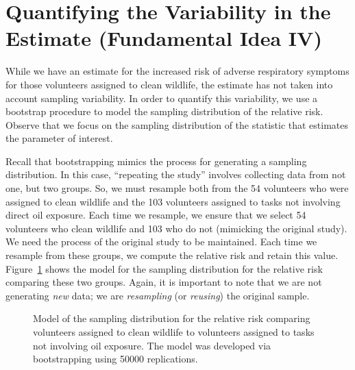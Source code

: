 \documentclass[
  letterpaper,
  DIV=11,
  numbers=noendperiod]{scrreprt}
\theoremstyle{definition}
\theoremstyle{definition}
\theoremstyle{plain}
\theoremstyle{remark}
\begin{document}
\section{Quantifying the Variability in the Estimate (Fundamental Idea
IV)}\label{quantifying-the-variability-in-the-estimate-fundamental-idea-iv}

While we have an estimate for the increased risk of adverse respiratory
symptoms for those volunteers assigned to clean wildlife, the estimate
has not taken into account sampling variability. In order to quantify
this variability, we use a bootstrap procedure to model the sampling
distribution of the relative risk. Observe that we focus on the sampling
distribution of the statistic that estimates the parameter of interest.

Recall that bootstrapping mimics the process for generating a sampling
distribution. In this case, ``repeating the study'' involves collecting
data from not one, but two groups. So, we must resample both from the 54
volunteers who were assigned to clean wildlife and the 103 volunteers
assigned to tasks not involving direct oil exposure. Each time we
resample, we ensure that we select 54 volunteers who clean wildlife and
103 who do not (mimicking the original study). We need the process of
the original study to be maintained. Each time we resample from these
groups, we compute the relative risk and retain this value.
Figure~\ref{fig-recaplanguage-sampling-distribution} shows the model for
the sampling distribution for the relative risk comparing these two
groups. Again, it is important to note that we are not generating
\emph{new} data; we are \emph{resampling} (or \emph{reusing}) the
original sample.

\begin{figure}


\caption{\label{fig-recaplanguage-sampling-distribution}Model of the
sampling distribution for the relative risk comparing volunteers
assigned to clean wildlife to volunteers assigned to tasks not involving
oil exposure. The model was developed via bootstrapping using 50000
replications.}

\end{figure}%
\end{document}
